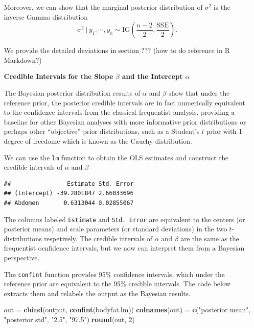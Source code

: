 \documentclass[]{book}
\newenvironment{Shaded}{\begin{snugshade}}{\end{snugshade}}
\newcommand{\KeywordTok}[1]{\textcolor[rgb]{0.13,0.29,0.53}{\textbf{#1}}}
\newcommand{\DecValTok}[1]{\textcolor[rgb]{0.00,0.00,0.81}{#1}}
\newcommand{\StringTok}[1]{\textcolor[rgb]{0.31,0.60,0.02}{#1}}
\newcommand{\OperatorTok}[1]{\textcolor[rgb]{0.81,0.36,0.00}{\textbf{#1}}}
\newcommand{\NormalTok}[1]{#1}
\theoremstyle{definition}
\theoremstyle{definition}
\theoremstyle{definition}
\theoremstyle{remark}
\begin{document}
Moreover, we can show that the marginal posterior distribution of
\(\sigma^2\) is the inverse Gamma distribution
\[ \sigma^2~|~y_1,\cdots,y_n \sim \text{IG}\left(\frac{n-2}{2}, \frac{\text{SSE}}{2}\right). \]

We provide the detailed deviations in section ??? (how to do reference
in R Markdown?)

\textbf{Credible Intervals for the Slope \(\beta\) and the Intercept
\(\alpha\) }

The Bayesian posterior distribution results of \(\alpha\) and \(\beta\)
show that under the reference prior, the posterior credible intervals
are in fact numerically equivalent to the confidence intervals from the
classical frequentist analysis, providing a baseline for other Bayesian
analyses with more informative prior distributions or perhaps other
``objective'' prior distributions, such as a Student's \(t\) prior with
1 degree of freedome which is known as the Cauchy distribution.

We can use the \texttt{lm} function to obtain the OLS estimates and
construct the credible intervals of \(\alpha\) and \(\beta\)

\begin{Shaded}
\end{Shaded}

\begin{verbatim}
##                Estimate Std. Error
## (Intercept) -39.2801847 2.66033696
## Abdomen       0.6313044 0.02855067
\end{verbatim}

The columns labeled \texttt{Estimate} and \texttt{Std.\ Error} are
equivalent to the centers (or posterior means) and scale parameters (or
standard deviations) in the two \(t\)-distributions respetively. The
credible intervals of \(\alpha\) and \(\beta\) are the same as the
frequentist ocnfidence intervals, but we now can interpret them from a
Bayesian perspective.

The \texttt{confint} function provides 95\% confidence intervals, which
under the reference prior are equivalent to the 95\% credible intervals.
The code below extracts them and relabels the output as the Bayesian
results.

\begin{Shaded}
\begin{Highlighting}[]
\NormalTok{out =}\StringTok{ }\KeywordTok{cbind}\NormalTok{(output, }\KeywordTok{confint}\NormalTok{(bodyfat.lm))}
\KeywordTok{colnames}\NormalTok{(out) =}\StringTok{ }\KeywordTok{c}\NormalTok{(}\StringTok{"posterior mean"}\NormalTok{, }\StringTok{"posterior std"}\NormalTok{, }\StringTok{"2.5"}\NormalTok{, }\StringTok{"97.5"}\NormalTok{)}
\KeywordTok{round}\NormalTok{(out, }\DecValTok{2}\NormalTok{)}
\end{Highlighting}
\end{Shaded}
\end{document}

